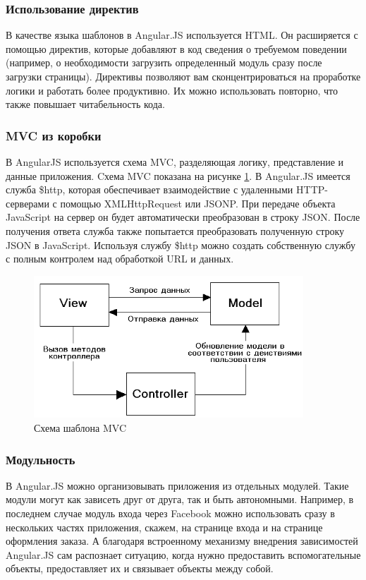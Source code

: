 \subsubsection*{Использование директив}
В качестве языка шаблонов в Angular.JS используется HTML. Он расширяется с помощью директив,
которые добавляют в код сведения о требуемом поведении (например, о необходимости загрузить
определенный модуль сразу после загрузки страницы). Директивы позволяют вам сконцентрироваться
на проработке логики и работать более продуктивно. Их можно использовать повторно, что
также повышает читабельность кода.
\subsubsection*{MVC из коробки}
В AngularJS используется схема MVC, разделяющая логику, представление и данные приложения.
Cхема MVC показана на рисунке \ref{mvc}.
В Angular.JS имеется служба \$http, которая обеспечивает взаимодействие с удаленными
HTTP-серверами с помощью XMLHttpRequest или JSONP. При передаче объекта JavaScript
на сервер он будет автоматически преобразован в строку JSON. После получения ответа
служба также попытается преобразовать полученную строку JSON в JavaScript.
Используя службу \$http можно создать собственную службу с полным контролем над
обработкой URL и данных.

\begin{figure}
  \centering
  \includegraphics[width=0.9\textwidth]{images/mvc.png}
  \caption{Схема шаблона MVC\label{mvc}}
\end{figure}

\subsubsection*{Модульность}
В Angular.JS можно организовывать приложения из отдельных модулей. Такие модули
могут как зависеть друг от друга, так и быть автономными. Например, в последнем
случае модуль входа через Facebook можно использовать сразу в нескольких частях приложения,
скажем, на странице входа и на странице оформления заказа. А благодаря встроенному механизму
внедрения зависимостей Angular.JS сам распознает ситуацию, когда нужно предоставить
вспомогательные объекты, предоставляет их и связывает объекты между собой.
